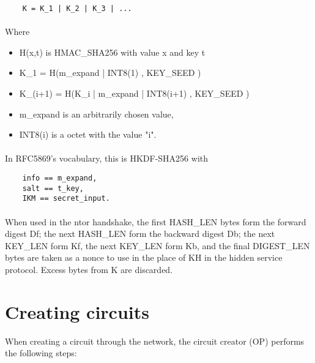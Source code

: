 \begin{verbatim}
    K = K_1 | K_2 | K_3 | ...
\end{verbatim}

\paragraph{}
Where

\begin{itemize}
    \item H(x,t) is HMAC\_SHA256 with value x and key t
    \item K\_1 = H(m\_expand | INT8(1) , KEY\_SEED )
    \item K\_(i+1) = H(K\_i | m\_expand | INT8(i+1) , KEY\_SEED )
    \item m\_expand is an arbitrarily chosen value,
    \item INT8(i) is a octet with the value "i".
\end{itemize}

\paragraph{}
In RFC5869's vocabulary, this is HKDF-SHA256 with

\begin{verbatim}
    info == m_expand,
    salt == t_key,
    IKM == secret_input.
\end{verbatim}

\paragraph{}
When used in the ntor handshake, the first HASH\_LEN bytes form the
forward digest Df; the next HASH\_LEN form the backward digest Db; the
next KEY\_LEN form Kf, the next KEY\_LEN form Kb, and the final
DIGEST\_LEN bytes are taken as a nonce to use in the place of KH in the
hidden service protocol. Excess bytes from K are discarded.

\section{Creating circuits}

When creating a circuit through the network, the circuit creator
(OP) performs the following steps:


